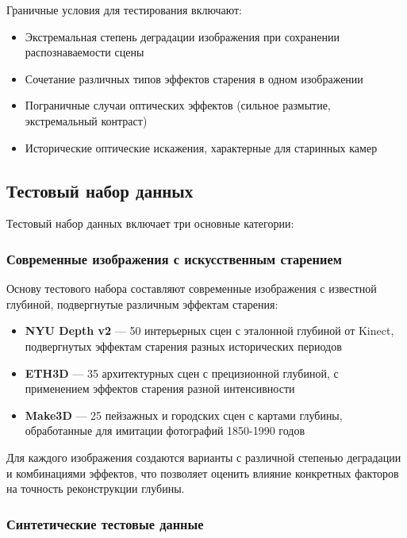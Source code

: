 Граничные условия для тестирования включают:
\begin{itemize}
    \item Экстремальная степень деградации изображения при сохранении распознаваемости сцены
    \item Сочетание различных типов эффектов старения в одном изображении
    \item Пограничные случаи оптических эффектов (сильное размытие, экстремальный контраст)
    \item Исторические оптические искажения, характерные для старинных камер
\end{itemize}

\subsection{Тестовый набор данных}

Тестовый набор данных включает три основные категории:

\subsubsection{Современные изображения с искусственным старением}

Основу тестового набора составляют современные изображения с известной глубиной, подвергнутые различным эффектам старения:

\begin{itemize}
    \item \textbf{NYU Depth v2} --- 50 интерьерных сцен с эталонной глубиной от Kinect, подвергнутых эффектам старения разных исторических периодов
    \item \textbf{ETH3D} --- 35 архитектурных сцен с прецизионной глубиной, с применением эффектов старения разной интенсивности
    \item \textbf{Make3D} --- 25 пейзажных и городских сцен с картами глубины, обработанные для имитации фотографий 1850-1990 годов
\end{itemize}

Для каждого изображения создаются варианты с различной степенью деградации и комбинациями эффектов, что позволяет оценить влияние конкретных факторов на точность реконструкции глубины.

\subsubsection{Синтетические тестовые данные}

